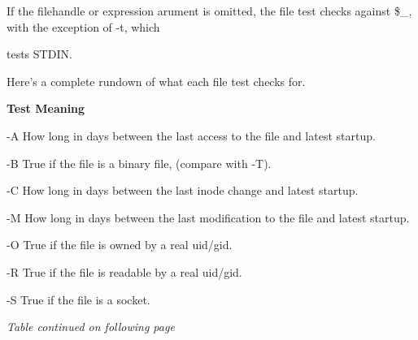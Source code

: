 \documentclass[a4paper,11pt]{book}
\begin{document}
\noindent If the filehandle or expression arument is omitted, the file test checks against \$\_, with the exception of -t, which

\noindent tests STDIN.

\noindent 

\noindent 

\noindent Here's a complete rundown of what each file test checks for.

\noindent 

\noindent 

\noindent \textbf{Test Meaning}

\noindent 

\noindent -A How long in days between the last access to the file and latest startup.

\noindent 

\noindent -B True if the file is a binary file, (compare with -T).

\noindent 

\noindent -C How long in days between the last inode change and latest startup.

\noindent 

\noindent -M How long in days between the last modification to the file and latest startup.

\noindent 

\noindent -O True if the file is owned by a real uid/gid.

\noindent 

\noindent -R True if the file is readable by a real uid/gid.

\noindent 

\noindent -S True if the file is a socket.

\noindent 

\noindent \textit{Table continued on following page}

\noindent  

     

\noindent  

\noindent  

\noindent 

\noindent 
\end{document}
